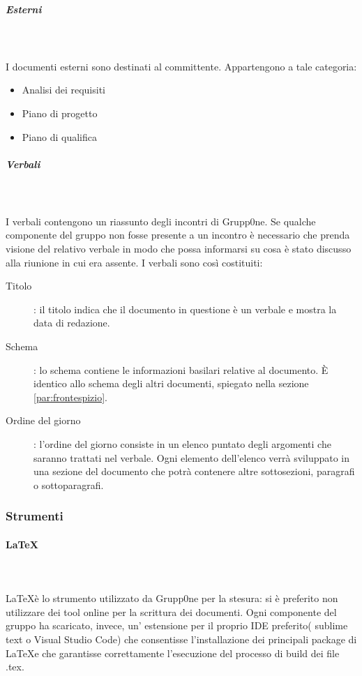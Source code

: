\documentclass[../norme-di-progetto.tex]{subfiles}
\begin{document}
\subparagraph{Esterni}\mbox{}\\
\label{subp:esterni}
\\ I documenti esterni sono destinati al committente. Appartengono a tale categoria:

\begin{itemize}
  \item Analisi dei requisiti
  \item Piano di progetto
  \item Piano di qualifica
\end{itemize}

\subparagraph{Verbali}\mbox{}\\
\label{subp:verbali}
\\ I verbali contengono un riassunto degli incontri di Grupp0ne. Se qualche componente del gruppo non fosse presente a un incontro è necessario che prenda visione del relativo verbale in modo che possa informarsi su cosa è stato discusso alla riunione in cui era assente. I verbali sono così costituiti:
\begin{description}
  \item [Titolo]: il titolo indica che il documento in questione è un verbale e mostra la data di redazione.
  \item [Schema]: lo schema contiene le informazioni basilari relative al documento. È identico allo schema degli altri documenti, spiegato nella sezione \ref{par:frontespizio}.
  \item [Ordine del giorno]: l'ordine del giorno consiste in un elenco puntato degli argomenti che saranno trattati nel verbale. Ogni elemento dell'elenco verrà sviluppato in una sezione del documento che potrà contenere altre sottosezioni, paragrafi o sottoparagrafi.
\end{description}
\subsubsection{Strumenti}
\paragraph {\LaTeX}\mbox{}\\
\label{par:LaTeX}
\\ \LaTeX  è lo strumento utilizzato da Grupp0ne per la stesura: si è preferito non utilizzare dei tool online per la scrittura dei documenti. Ogni componente del gruppo ha scaricato, invece, un' estensione per il proprio IDE preferito( sublime text o Visual Studio Code) che consentisse l'installazione dei principali package di \LaTeX e che garantisse correttamente l'esecuzione del processo di build dei file .tex.
\end{document}
